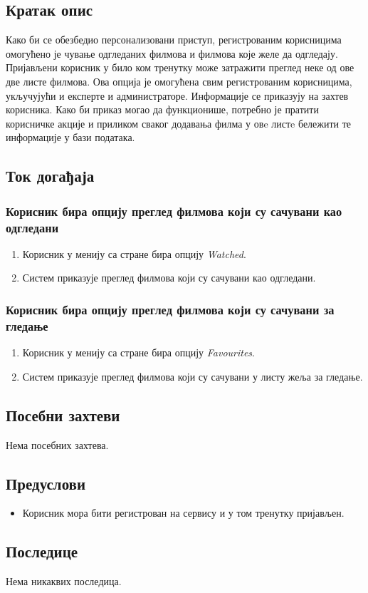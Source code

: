 \subsection{Кратак опис}

Како би се обезбедио персонализовани приступ, регистрованим корисницима омогућено је чување одгледаних
филмова и филмова које желе да одгледају. Пријављени корисник у било ком тренутку може затражити преглед 
неке од ове две листе филмова. Ова опција је омогућена свим регистрованим корисницима, укључујући и експерте 
и администраторе. Информације се приказују на захтев корисника. Како би приказ могао да функционише, потребно  
је пратити корисничке акције и приликом сваког додавања филма у овe листe бележити те информације у бази података.

\subsection{Ток догађаја}

\subsubsection{Корисник бира опцију преглед филмова који су сачувани као одгледани}

\begin{enumerate}
    \item Корисник у менију са стране бира опцију \textit{Watched}.
    \item Систем приказује преглед филмова који су сачувани као одгледани.
\end{enumerate}

\subsubsection{Корисник бира опцију преглед филмова који су сачувани за гледање}

\begin{enumerate}
    \item Корисник у менију са стране бира опцију \textit{Favourites}.
    \item Систем приказује преглед филмова који су сачувани у листу жеља за гледање.
\end{enumerate}

\subsection{Посебни захтеви}

Нема посебних захтева.

\subsection{Предуслови}

\begin{itemize}
    \item Корисник мора бити регистрован на сервису и у том тренутку пријављен.
\end{itemize}

\subsection{Последице}

Нема никаквих последица.

